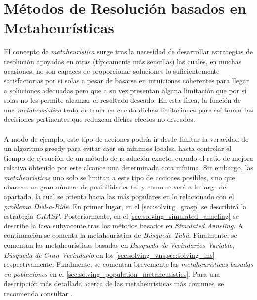 \documentclass{subfiles}
\begin{document}
    \section{Métodos de Resolución basados en Metaheurísticas}
    \label{sec:solving_metaheuristics}

      \paragraph{}
      El concepto de \emph{metaheurística} surge tras la necesidad de desarrollar estrategias de resolución apoyadas en otras (típicamente más sencillas) las cuales, en muchas ocasiones, no son capaces de proporcionar soluciones lo suficientemente satisfactorias por si solas a pesar de basarse en intuiciones coherentes para llegar a soluciones adecuadas pero que a su vez presentan alguna limitación que por si solas no les permite alcanzar el resultado deseado. En esta línea, la función de una \emph{metaheurística} trata de tener en cuenta dichas limitaciones para así tomar las decisiones pertinentes que reduzcan dichos efectos no deseados.

      \paragraph{}
      A modo de ejemplo, este tipo de acciones podría ir desde limitar la voracidad de un algoritmo greedy para evitar caer en mínimos locales, hasta controlar el tiempo de ejecución de un método de resolución exacto, cuando el ratio de mejora relativa obtenido por este alcance una determinada cota mínima. Sin embargo, las \emph{metaheurísticas} uno solo se limitan a este tipo de acciones posibles, sino que abarcan un gran número de posibilidades tal y como se verá a lo largo del apartado, la cual se orienta hacia las más populares en lo relacionado con el \emph{problema Dial-a-Ride}. En primer lugar, en el \cref{sec:solving_grasp} se describirá la estrategia \emph{GRASP}. Posteriormente, en el \cref{sec:solving_simulated_anneling} se describe la idea subyacente tras los métodos basados en \emph{Simulated Anneling}. A continuación se comenta la metaheurística de \emph{Búsqueda Tabú}. Finalmente, se comentan las metaheurísticas basadas en \emph{Busqueda de Vecindarios Variable}, \emph{Búsqueda de Gran Vecindario} en los \cref{sec:solving_vns,sec:solving_lns} respectivamente. Finalmente, se comentan brevemente las \emph{metaheurísticas basadas en poblaciones} en el \cref{sec:solving_population_metaheuristics}. Para una descripción más detallada acerca de las metaheurísticas más comunes, se recomienda consultar \cite{blum2003metaheuristics,glover2006handbook,boussaid2013survey,ho2018survey}.
\end{document}
